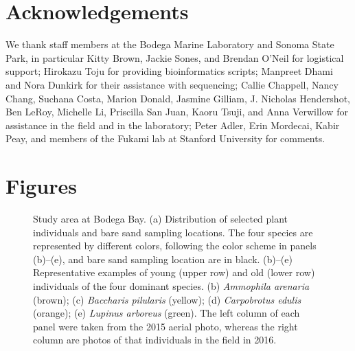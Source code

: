 \section{Acknowledgements}
We thank staff members at the Bodega Marine Laboratory and Sonoma State Park, in particular Kitty Brown, Jackie Sones, and Brendan O'Neil for logistical support; Hirokazu Toju for providing bioinformatics scripts; Manpreet Dhami and Nora Dunkirk for their assistance with sequencing; Callie Chappell, Nancy Chang, Suchana Costa, Marion Donald, Jasmine Gilliam, J. Nicholas Hendershot, Ben LeRoy, Michelle Li, Priscilla San Juan, Kaoru Tsuji, and Anna Verwillow for assistance in the field and in the laboratory; Peter Adler, Erin Mordecai, Kabir Peay, and members of the Fukami lab at Stanford University for comments.
\par



%
%



\newpage
\section{Figures}
\begin{figure}[h]
	\vspace*{-0.5cm}
	\centering
		\caption[Study area at Bodega Bay.]
			{\hspace{0.0mm} 
			Study area at Bodega Bay. (a) Distribution of selected plant individuals and bare sand sampling locations. The four species are represented by different colors, following the color scheme in panels (b)--(e), and bare sand sampling location are in black. 
			(b)--(e) Representative examples of young (upper row) and old (lower row) individuals of the four dominant species. (b) \textit{Ammophila arenaria} (brown); (c) \textit{Baccharis pilularis} (yellow); (d) \textit{Carpobrotus edulis} (orange); (e) \textit{Lupinus arboreus} (green). 
			The left column of each panel were taken from the 2015 aerial photo, whereas the right column are photos of that individuals in the field in 2016.}
	\label{fig:map}
\end{figure}



